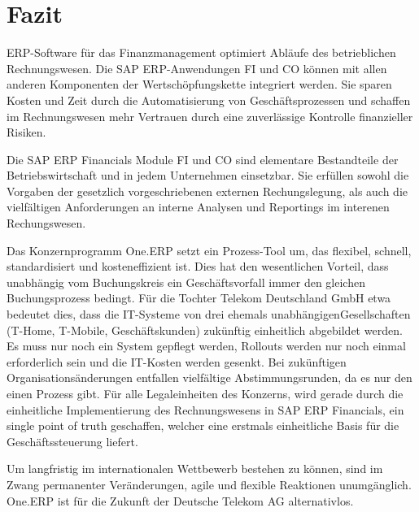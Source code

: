 \newpage
\section{Fazit}
ERP-Software für das Finanzmanagement optimiert Abläufe des betrieblichen Rechnungswesen. Die SAP ERP-Anwendungen FI und CO können mit allen anderen Komponenten der Wertschöpfungskette integriert werden. Sie sparen Kosten und Zeit durch die Automatisierung von Geschäftsprozessen und schaffen im Rechnungswesen mehr Vertrauen durch eine zuverlässige Kontrolle finanzieller Risiken. 

Die SAP ERP Financials Module FI und CO sind elementare Bestandteile der Betriebswirtschaft und in jedem Unternehmen einsetzbar. Sie erfüllen sowohl die Vorgaben der gesetzlich vorgeschriebenen externen Rechungslegung, als auch die vielfältigen Anforderungen an interne Analysen und Reportings im interenen Rechungswesen. 

Das Konzernprogramm One.ERP setzt ein Prozess-Tool um, das flexibel, schnell, standardisiert und kosteneffizient ist. Dies hat den wesentlichen Vorteil, dass unabhängig vom Buchungskreis ein Geschäftsvorfall immer den gleichen Buchungsprozess bedingt. Für die Tochter Telekom Deutschland GmbH etwa bedeutet dies, dass die IT-Systeme von drei ehemals \glqq unabhängigen\grqq Gesellschaften (T-Home, T-Mobile, Geschäftskunden) zukünftig einheitlich abgebildet werden. Es muss nur noch ein System gepflegt werden, Rollouts werden nur noch einmal erforderlich sein und die IT-Kosten werden gesenkt. Bei zukünftigen Organisationsänderungen entfallen vielfältige Abstimmungsrunden, da es nur den einen Prozess gibt. Für alle Legaleinheiten des Konzerns, wird gerade durch die einheitliche Implementierung des Rechnungswesens in SAP ERP Financials, ein single point of truth geschaffen, welcher eine erstmals einheitliche Basis für die Geschäftssteuerung liefert.

Um langfristig im internationalen Wettbewerb bestehen zu können, sind im Zwang permanenter Veränderungen, agile und flexible Reaktionen unumgänglich. One.ERP ist für die Zukunft der Deutsche Telekom AG alternativlos.